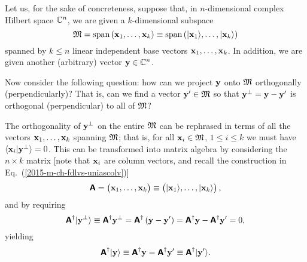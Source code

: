 Let us, for the sake of concreteness,
suppose that, in $n$-dimensional complex Hilbert space
${\Bbb C}^n$, we are given a $k$-dimensional subspace
\begin{equation}
{\frak M} = \textrm{span}\left( {\bf x}_1,\ldots ,{\bf x}_k \right)
\equiv \textrm{span}\left(\vert {\bf x}_1\rangle ,\ldots ,\vert {\bf x}_k \right\rangle )
\end{equation}
spanned
by  $k \le n$  linear independent base vectors ${\bf x}_1,\ldots ,{\bf x}_k$.
In addition, we are given another (arbitrary) vector ${\bf y} \in {\Bbb C}^n$.

Now consider the following question:
how can we project ${\bf y}$ onto ${\frak M}$ orthogonally (perpendicularly)?
That is, can we find a vector ${\bf y}' \in {\frak M}$ so that ${\bf y}^\perp = {\bf y} - {\bf y}'$
is orthogonal (perpendicular) to all of ${\frak M}$?

The orthogonality of ${\bf y}^\perp$ on the entire ${\frak M}$ can be rephrased in terms
of all the vectors ${\bf x}_1,\ldots ,{\bf x}_k$ spanning ${\frak M}$; that is,
for all ${\bf x}_i \in {\frak M}$, $1\le i\le k$
we must have
$\langle {\bf x}_i \vert {\bf y}^\perp \rangle = 0$.
This can be transformed into matrix algebra by considering the $n \times k$ matrix
[note that ${\bf x}_i$ are column vectors,
and recall the construction in Eq.~(\ref{2015-m-ch-fdlvs-uniascolv})]
\begin{equation}
\textsf{\textbf{A}} = \begin{pmatrix}
{\bf x}_1, \ldots ,{\bf x}_k
\end{pmatrix}
\equiv
\begin{pmatrix}
\vert {\bf x}_1\rangle , \ldots , \vert {\bf x}_k \rangle
\end{pmatrix},
\end{equation}
and by requiring
\begin{equation}
\textsf{\textbf{A}}^\dagger \vert {\bf y}^\perp \rangle   \equiv
 \textsf{\textbf{A}}^\dagger  {{\bf y}^\perp} =
 \textsf{\textbf{A}}^\dagger  \left({\bf y} - {\bf y}'\right) =
 \textsf{\textbf{A}}^\dagger {\bf y}  - \textsf{\textbf{A}}^\dagger {{\bf y}'}   =
0,
\end{equation}
yielding
\begin{equation}
 \textsf{\textbf{A}}^\dagger  \vert  {\bf y}  \rangle
\equiv
 \textsf{\textbf{A}}^\dagger   {\bf y}
=
\textsf{\textbf{A}}^\dagger  {{\bf y}'}
\equiv
\textsf{\textbf{A}}^\dagger \vert {\bf y}' \rangle .
\label{2015-m-ch-cfvs-opab1}
\end{equation}

